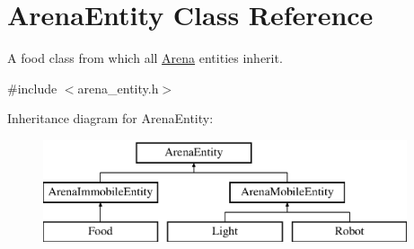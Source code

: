 \hypertarget{class_arena_entity}{}\section{Arena\+Entity Class Reference}
\label{class_arena_entity}


A food class from which all \mbox{\hyperlink{class_arena}{Arena}} entities inherit.  




{\ttfamily \#include $<$arena\+\_\+entity.\+h$>$}

Inheritance diagram for Arena\+Entity\+:\begin{figure}[H]
\begin{center}
\leavevmode
\includegraphics[height=3.000000cm]{class_arena_entity}
\end{center}
\end{figure}
